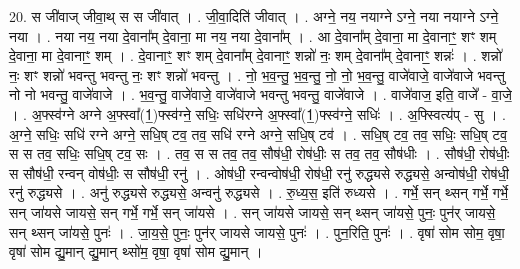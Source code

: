\documentclass[17pt]{extarticle}
\begin{document}
20. स जी॑वाज् जीवा॒थ् स स जी॑वात् । . जी॒वा॒दिति॑ जीवात् । . अग्ने॒ नय॒ नयाग्ने ऽग्ने॒ नया नयाग्ने ऽग्ने॒ नया । . नया नय॒ नया दे॒वाना᳚म् दे॒वाना॒ मा नय॒ नया दे॒वाना᳚म् । . आ दे॒वाना᳚म् दे॒वाना॒ मा दे॒वानाꣳ॒॒ शꣳ शम् दे॒वाना॒ मा दे॒वानाꣳ॒॒ शम् । . दे॒वानाꣳ॒॒ शꣳ शम् दे॒वाना᳚म् दे॒वानाꣳ॒॒ शन्नो॑ नः॒ शम् दे॒वाना᳚म् दे॒वानाꣳ॒॒ शन्नः॑ । . शन्नो॑ नः॒ शꣳ शन्नो॑ भवन्तु भवन्तु नः॒ शꣳ शन्नो॑ भवन्तु । . नो॒ भ॒व॒न्तु॒ भ॒व॒न्तु॒ नो॒ नो॒ भ॒व॒न्तु॒ वाजे॑वाजे॒ वाजे॑वाजे भवन्तु नो नो भवन्तु॒ वाजे॑वाजे । . भ॒व॒न्तु॒ वाजे॑वाजे॒ वाजे॑वाजे भवन्तु भवन्तु॒ वाजे॑वाजे । . वाजे॑वाज॒ इति॒ वाजे᳚ - वा॒जे॒ । . अ॒फ्स्व॑ग्ने अग्ने अ॒फ्स्वा᳚(1॒)फ्स्व॑ग्ने॒ सधिः॒ सधि॑रग्ने अ॒फ्स्वा᳚(1॒)फ्स्व॑ग्ने॒ सधिः॑ । . अ॒फ्स्वित्य॑प् - सु । . अ॒ग्ने॒ सधिः॒ सधि॑ रग्ने अग्ने॒ सधि॒ष् टव॒ तव॒ सधि॑ रग्ने अग्ने॒ सधि॒ष् टव॑ । . सधि॒ष् टव॒ तव॒ सधिः॒ सधि॒ष् टव॒ स स तव॒ सधिः॒ सधि॒ष् टव॒ सः । . तव॒ स स तव॒ तव॒ सौष॑धी॒ रोष॑धीः॒ स तव॒ तव॒ सौष॑धीः । . सौष॑धी॒ रोष॑धीः॒ स सौष॑धी॒ रन्वन् वोष॑धीः॒ स सौष॑धी॒ रनु॑ । . ओष॑धी॒ रन्वन्वोष॑धी॒ रोष॑धी॒ रनु॑ रुद्ध्यसे रुद्ध्यसे॒ अन्वोष॑धी॒ रोष॑धी॒ रनु॑ रुद्ध्यसे । . अनु॑ रुद्ध्यसे रुद्ध्यसे॒ अन्वनु॑ रुद्ध्यसे । . रु॒ध्य॒स॒ इति॑ रुध्यसे । . गर्भे॒ सन् थ्सन् गर्भे॒ गर्भे॒ सन् जा॑यसे जायसे॒ सन् गर्भे॒ गर्भे॒ सन् जा॑यसे । . सन् जा॑यसे जायसे॒ सन् थ्सन् जा॑यसे॒ पुनः॒ पुन॑र् जायसे॒ सन् थ्सन् जा॑यसे॒ पुनः॑ । . जा॒य॒से॒ पुनः॒ पुन॑र् जायसे जायसे॒ पुनः॑ । . पुन॒रिति॒ पुनः॑ । . वृषा॑ सोम सोम॒ वृषा॒ वृषा॑ सोम द्यु॒मान् द्यु॒मान् थ्सो॑म॒ वृषा॒ वृषा॑ सोम द्यु॒मान् । \newline
\end{document}
